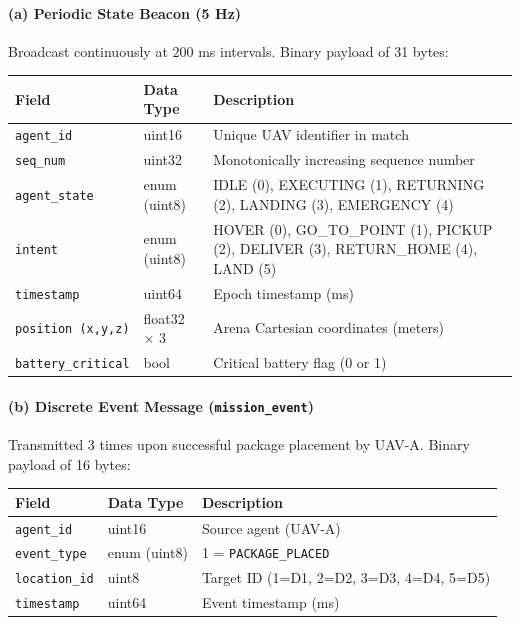 \documentclass[12pt,a4paper]{article}
\begin{document}
\paragraph{(a) Periodic State Beacon (5 Hz)}
Broadcast continuously at $200$ ms intervals. Binary payload of 31 bytes:
\begin{center}
\begin{tabular}{p{3.2cm}p{3.0cm}p{7.5cm}}
\toprule
\textbf{Field} & \textbf{Data Type} & \textbf{Description} \\
\midrule
\texttt{agent\_id} & uint16 & Unique UAV identifier in match \\
\texttt{seq\_num} & uint32 & Monotonically increasing sequence number \\
\texttt{agent\_state} & enum (uint8) & IDLE (0), EXECUTING (1), RETURNING (2), LANDING (3), EMERGENCY (4) \\
\texttt{intent} & enum (uint8) & HOVER (0), GO\_TO\_POINT (1), PICKUP (2), DELIVER (3), RETURN\_HOME (4), LAND (5) \\
\texttt{timestamp} & uint64 & Epoch timestamp (ms) \\
\texttt{position (x,y,z)} & float32 $\times$ 3 & Arena Cartesian coordinates (meters) \\
\texttt{battery\_critical} & bool & Critical battery flag (0 or 1) \\
\bottomrule
\end{tabular}
\end{center}

\paragraph{(b) Discrete Event Message (\texttt{mission\_event})}
Transmitted 3 times upon successful package placement by UAV-A. Binary payload of 16 bytes:
\begin{center}
\begin{tabular}{p{3.2cm}p{3.0cm}p{7.5cm}}
\toprule
\textbf{Field} & \textbf{Data Type} & \textbf{Description} \\
\midrule
\texttt{agent\_id} & uint16 & Source agent (UAV-A) \\
\texttt{event\_type} & enum (uint8) & 1 = \texttt{PACKAGE\_PLACED} \\
\texttt{location\_id} & uint8 & Target ID (1=D1, 2=D2, 3=D3, 4=D4, 5=D5) \\
\texttt{timestamp} & uint64 & Event timestamp (ms) \\
\bottomrule
\end{tabular}
\end{center}
\end{document}
